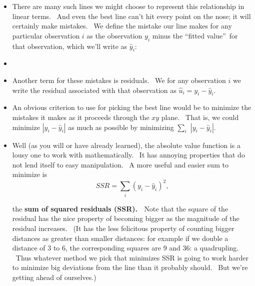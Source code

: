 \documentclass[11pt]{article}
\begin{document}
\begin{itemize}
\item There are many such lines we might choose to represent this
relationship in linear terms. \ And even the best line can't hit every point
on the nose; it will certainly make mistakes. \ We define the mistake our
line makes for any particular observation $i$ as the observation $y_{i}$
minus the \textquotedblleft fitted value\textquotedblright\ for that
observation, which we'll write as $\widehat{y}_{i}:$

\item {}

\item Another term for these mistakes is residuals. \ We for any observation 
$i$ we write the residual associated with that observation as $\widehat{u}%
_{i}=y_{i}-\widehat{y}_{i}.$

\item An obvious criterion to use for picking the best line would be to
minimize the mistakes it makes as it proceeds through the $xy$ plane. \ That
is, we could minimize $\left\vert y_{i}-\widehat{y}_{i}\right\vert $ as much
as possible by minimizing $\sum_{i}$ $\left\vert y_{i}-\widehat{y}%
_{i}\right\vert .$

\item Well (as you will or have already learned), the absolute value
function is a lousy one to work with mathematically. \ It has annoying
properties that do not lend itself to easy manipulation. \ A more useful and
easier sum to minimize is%
\begin{equation*}
SSR=\sum_{i}\left( y_{i}-\widehat{y}_{i}\right) ^{2},
\end{equation*}

the \textbf{sum of squared residuals (SSR). \ }Note that the square of the
residual has the nice property of becoming bigger as the magnitude of the
residual increases. \ (It has the less felicitous property of counting
bigger distances as greater than smaller distances: for example if we double
a distance of 3 to 6, the corresponding squares are 9 and 36: a quadrupling.
\ Thus whatever method we pick that minimizes SSR is going to work harder to
minimize big deviations from the line than it probably should. \ But we're
getting ahead of ourselves.)


\end{itemize}
\end{document}
